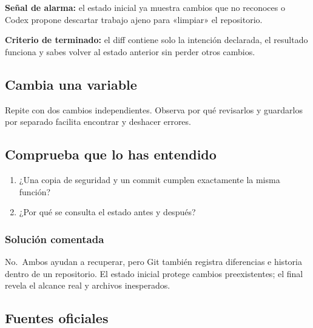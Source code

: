 \documentclass[10pt,a4paper,openany]{book}
\providecommand{\tightlist}{\setlength{\itemsep}{0.18em}\setlength{\parskip}{0pt}}
\begin{document}
\begin{warningbox}

\textbf{Señal de alarma:} el estado inicial ya muestra cambios que no
reconoces o Codex propone descartar trabajo ajeno para «limpiar» el
repositorio.

\end{warningbox}

\begin{successbox}

\textbf{Criterio de terminado:} el diff contiene solo la intención
declarada, el resultado funciona y sabes volver al estado anterior sin
perder otros cambios.

\end{successbox}

\subsection{Cambia una variable}\label{cambia-una-variable-14}

Repite con dos cambios independientes. Observa por qué revisarlos y
guardarlos por separado facilita encontrar y deshacer errores.

\subsection{Comprueba que lo has
entendido}\label{comprueba-que-lo-has-entendido-14}

\begin{enumerate}
\def\labelenumi{\arabic{enumi}.}
\tightlist
\item
  ¿Una copia de seguridad y un commit cumplen exactamente la misma
  función?
\item
  ¿Por qué se consulta el estado antes y después?
\end{enumerate}

\subsubsection{Solución comentada}\label{soluciuxf3n-comentada-15}

No.~Ambos ayudan a recuperar, pero Git también registra diferencias e
historia dentro de un repositorio. El estado inicial protege cambios
preexistentes; el final revela el alcance real y archivos inesperados.

\subsection{Fuentes oficiales}\label{fuentes-oficiales-14}
\end{document}
